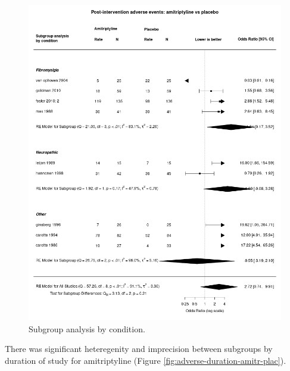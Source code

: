 \documentclass{report}\usepackage[]{graphicx}\usepackage[]{color}
\begin{document}
\begin{figure}

\includegraphics[width=\textwidth]{img/adverse-condition-amitriptyline-placebo-forest.png}
\caption[Adverse by condition: amitriptyline]{
Subgroup analysis by condition. 
}
\label{fig:adverse-condition-amitr-plac}
\end{figure}

There was significant heteregenity and imprecision between subgroups by duration of study for amitriptyline (Figure \ref{fig:adverse-duration-amitr-plac}).
\end{document}
